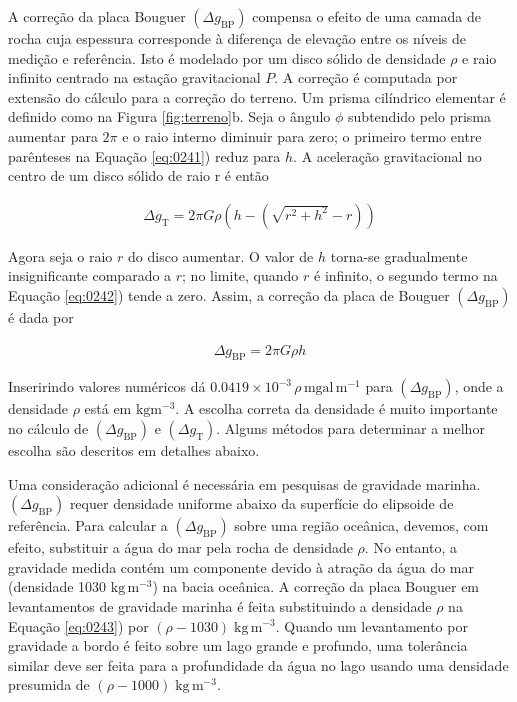 \documentclass[]{book}
\theoremstyle{definition}
\theoremstyle{definition}
\theoremstyle{definition}
\theoremstyle{remark}
\begin{document}
A correção da placa Bouguer \(\left(\Delta g_{\mathrm{BP}}\right)\) compensa o efeito de uma camada de rocha cuja espessura corresponde à diferença de elevação entre os níveis de medição e referência. Isto é modelado por um disco sólido de densidade \(\rho\) e raio infinito centrado na estação gravitacional \(P\). A correção é computada por extensão do cálculo para a correção do terreno. Um prisma cilíndrico elementar é definido como na Figura \ref{fig:terreno}b. Seja o ângulo \(\phi\) subtendido pelo prisma aumentar para \(2\pi\) e o raio interno diminuir para zero; o primeiro termo entre parênteses na Equação \eqref{eq:0241}) reduz para \(h\). A aceleração gravitacional no centro de um disco sólido de raio r é então

\begin{align}
\Delta g_{\mathrm{T}}=2 \pi G \rho\left(h-\left(\sqrt{r^{2}+h^{2}}-r\right)\right) \label{eq:0242}
\end{align}

Agora seja o raio \(r\) do disco aumentar. O valor de \(h\) torna-se gradualmente insignificante comparado a \(r\); no limite, quando \(r\) é infinito, o segundo termo na Equação \eqref{eq:0242}) tende a zero. Assim, a correção da placa de Bouguer \(\left(\Delta g_{\mathrm{BP}}\right)\) é dada por

\begin{align}
\Delta g_{\mathrm{BP}}=2 \pi G \rho h \label{eq:0243}
\end{align}

Inseririndo valores numéricos dá \(0.0419\times 10^{-3}\,\rho\, \mathrm{mgal} \,\mathrm{m}^{-1}\) para \(\left(\Delta g_{\mathrm{BP}}\right)\), onde a densidade \(\rho\) está em \(\mathrm{kg}\mathrm{m}^{-3}\). A escolha correta da densidade é muito importante no cálculo de \(\left(\Delta g_{\mathrm{BP}}\right)\) e \(\left(\Delta g_{\mathrm{T}}\right)\). Alguns métodos para determinar a melhor escolha são descritos em detalhes abaixo.

Uma consideração adicional é necessária em pesquisas de gravidade marinha. \(\left(\Delta g_{\mathrm{BP}}\right)\) requer densidade uniforme abaixo da superfície do elipsoide de referência. Para calcular a \(\left(\Delta g_{\mathrm{BP}}\right)\) sobre uma região oceânica, devemos, com efeito, substituir a água do mar pela rocha de densidade \(\rho\). No entanto, a gravidade medida contém um componente devido à atração da água do mar (densidade 1030 \(\mathrm{kg}\,\mathrm{m}^{-3}\)) na bacia oceânica. A correção da placa Bouguer em levantamentos de gravidade marinha é feita substituindo a densidade \(\rho\) na Equação \eqref{eq:0243}) por \((\rho - 1030)\;\mathrm{kg}\,\mathrm{m}^{-3}\). Quando um levantamento por gravidade a bordo é feito sobre um lago grande e profundo, uma tolerância similar deve ser feita para a profundidade da água no lago usando uma densidade presumida de \((\rho - 1000)\;\mathrm{kg}\,\mathrm{m}^{-3}\).
\end{document}
